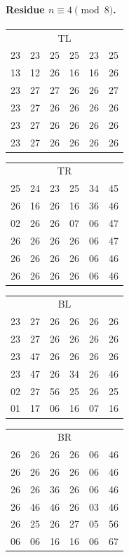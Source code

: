 \paragraph{Residue $n\equiv 4\pmod 8$.}
\begin{center}\scriptsize\ttfamily
\begin{tabular}[t]{@{}c@{\,}c@{\,}c@{\,}c@{\,}c@{\,}c@{}}\multicolumn{6}{c}{\normalfont\scriptsize TL}\\
23 & 23 & 25 & 25 & 23 & 25\\
13 & 12 & 26 & 16 & 16 & 26\\
23 & 27 & 27 & 26 & 26 & 27\\
23 & 27 & 26 & 26 & 26 & 26\\
23 & 27 & 26 & 26 & 26 & 26\\
23 & 27 & 26 & 26 & 26 & 26\end{tabular}\qquad
\begin{tabular}[t]{@{}c@{\,}c@{\,}c@{\,}c@{\,}c@{\,}c@{}}\multicolumn{6}{c}{\normalfont\scriptsize TR}\\
25 & 24 & 23 & 25 & 34 & 45\\
26 & 16 & 26 & 16 & 36 & 46\\
02 & 26 & 26 & 07 & 06 & 47\\
26 & 26 & 26 & 26 & 06 & 47\\
26 & 26 & 26 & 26 & 06 & 46\\
26 & 26 & 26 & 26 & 06 & 46\end{tabular}\qquad
\begin{tabular}[t]{@{}c@{\,}c@{\,}c@{\,}c@{\,}c@{\,}c@{}}\multicolumn{6}{c}{\normalfont\scriptsize BL}\\
23 & 27 & 26 & 26 & 26 & 26\\
23 & 27 & 26 & 26 & 26 & 26\\
23 & 47 & 26 & 26 & 26 & 26\\
23 & 47 & 26 & 34 & 26 & 46\\
02 & 27 & 56 & 25 & 26 & 25\\
01 & 17 & 06 & 16 & 07 & 16\end{tabular}\qquad
\begin{tabular}[t]{@{}c@{\,}c@{\,}c@{\,}c@{\,}c@{\,}c@{}}\multicolumn{6}{c}{\normalfont\scriptsize BR}\\
26 & 26 & 26 & 26 & 06 & 46\\
26 & 26 & 26 & 26 & 06 & 46\\
26 & 26 & 36 & 26 & 06 & 46\\
26 & 46 & 46 & 26 & 03 & 46\\
26 & 25 & 26 & 27 & 05 & 56\\
06 & 06 & 16 & 16 & 06 & 67\end{tabular}
\end{center}

